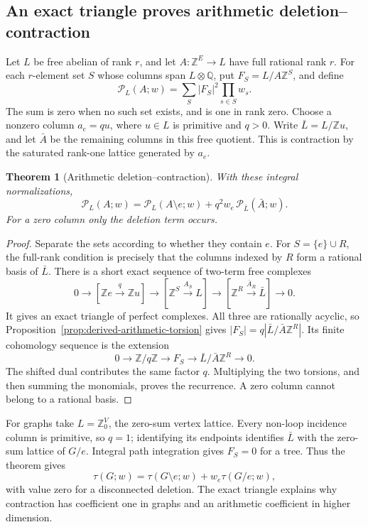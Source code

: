 \documentclass[11pt]{article}
\newtheorem{theorem}{Theorem}[section]
\theoremstyle{definition}
\theoremstyle{remark}
\newcommand{\Q}{\mathbb Q}
\newcommand{\Z}{\mathbb Z}
\begin{document}
\subsection{An exact triangle proves arithmetic deletion--contraction}
\label{sec:derived-arithmetic-contraction}

Let \(L\) be free abelian of rank \(r\), and let
\(A:\Z^E\to L\) have full rational rank \(r\).
For each \(r\)-element set \(S\) whose columns span \(L\otimes\Q\), put
\(F_S=L/A\Z^S\), and define
\[
 \mathcal P_L(A;w)=\sum_S |F_S|^2\prod_{s\in S}w_s.
\]
The sum is zero when no such set exists, and is one in rank zero.
Choose a nonzero column \(a_e=q u\), where \(u\in L\) is primitive and
\(q>0\). Write \(\bar L=L/\Z u\), and let \(\bar A\) be the remaining
columns in this free quotient. This is contraction by the saturated
rank-one lattice generated by \(a_e\).

\begin{theorem}[Arithmetic deletion--contraction]
\label{thm:derived-arithmetic-contraction}
With these integral normalizations,
\begin{equation}\label{eq:derived-arithmetic-contraction}
 \mathcal P_L(A;w)=
 \mathcal P_L(A\setminus e;w)
       +q^2w_e\,\mathcal P_{\bar L}(\bar A;w).
\end{equation}
For a zero column only the deletion term occurs.
\end{theorem}
\begin{proof}
Separate the sets according to whether they contain \(e\). For
\(S=\{e\}\cup R\), the full-rank condition is precisely that the
columns indexed by \(R\) form a rational basis of \(\bar L\).
There is a short exact sequence of two-term free complexes
\[
 0\longrightarrow[\Z e\xrightarrow{q}\Z u]
 \longrightarrow[\Z^S\xrightarrow{A_S}L]
 \longrightarrow[\Z^R\xrightarrow{\bar A_R}\bar L]
 \longrightarrow0.
\]
It gives an exact triangle of perfect complexes. All three are
rationally acyclic, so Proposition~\ref{prop:derived-arithmetic-torsion}
gives \(|F_S|=q|\bar L/\bar A\Z^R|\). Its finite cohomology sequence is
the extension
\[
 0\longrightarrow\Z/q\Z\longrightarrow F_S
 \longrightarrow\bar L/\bar A\Z^R\longrightarrow0.
\]
The shifted dual contributes the same factor \(q\). Multiplying the
two torsions, and then summing the monomials, proves the recurrence.
A zero column cannot belong to a rational basis.
\end{proof}

For graphs take \(L=\Z^V_0\), the zero-sum vertex lattice. Every
non-loop incidence column is primitive, so \(q=1\); identifying its
endpoints identifies \(\bar L\) with the zero-sum lattice of \(G/e\).
Integral path integration gives \(F_S=0\) for a tree. Thus the theorem
gives
\[
 \tau(G;w)=\tau(G\setminus e;w)+w_e\tau(G/e;w),
\]
with value zero for a disconnected deletion. The exact triangle
explains why contraction has coefficient one in graphs and an
arithmetic coefficient in higher dimension.
\end{document}

